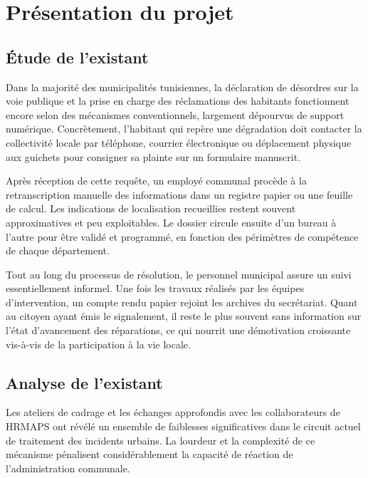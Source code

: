 \section{Présentation du projet}

\subsection{Étude de l'existant}
Dans la majorité des municipalités tunisiennes, la déclaration de désordres sur la voie publique et la prise en charge des réclamations des habitants fonctionnent encore selon des mécanismes conventionnels, largement dépourvus de support numérique. Concrètement, l'habitant qui repère une dégradation doit contacter la collectivité locale par téléphone, courrier électronique ou déplacement physique aux guichets pour consigner sa plainte sur un formulaire manuscrit.

Après réception de cette requête, un employé communal procède à la retranscription manuelle des informations dans un registre papier ou une feuille de calcul. Les indications de localisation recueillies restent souvent approximatives et peu exploitables. Le dossier circule ensuite d'un bureau à l'autre pour être validé et programmé, en fonction des périmètres de compétence de chaque département.

Tout au long du processus de résolution, le personnel municipal assure un suivi essentiellement informel. Une fois les travaux réalisés par les équipes d'intervention, un compte rendu papier rejoint les archives du secrétariat. Quant au citoyen ayant émis le signalement, il reste le plus souvent sans information sur l'état d'avancement des réparations, ce qui nourrit une démotivation croissante vis-à-vis de la participation à la vie locale.

\subsection{Analyse de l'existant}
Les ateliers de cadrage et les échanges approfondis avec les collaborateurs de HRMAPS ont révélé un ensemble de faiblesses significatives dans le circuit actuel de traitement des incidents urbains. La lourdeur et la complexité de ce mécanisme pénalisent considérablement la capacité de réaction de l'administration communale.

